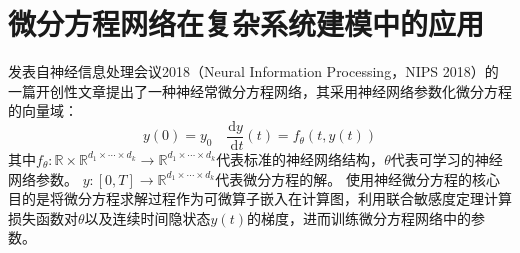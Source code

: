 
\section{微分方程网络在复杂系统建模中的应用}
发表自神经信息处理会议2018（Neural Information Processing，NIPS 2018）的一篇开创性文章\cite{chen2018neural}提出了一种神经常微分方程网络，其采用神经网络参数化微分方程的向量域\cite{kidger2021}：
\begin{equation}
y(0)=y_0 \quad \frac{\mathrm{d} y}{\mathrm{~d} t}(t)=f_\theta(t, y(t))
\end{equation}
其中$f_\theta: \mathbb{R} \times \mathbb{R}^{d_1 \times \cdots \times d_k} \rightarrow \mathbb{R}^{d_1 \times \cdots \times d_k}$代表标准的神经网络结构，$\theta$代表可学习的神经网络参数。
$y:[0, T] \rightarrow \mathbb{R}^{d_1 \times \cdots \times d_k}$代表微分方程的解。
使用神经微分方程的核心目的是将微分方程求解过程作为可微算子嵌入在计算图，利用联合敏感度定理\cite{chen2018neural}计算损失函数对$\theta$以及连续时间隐状态$y(t)$的梯度，进而训练微分方程网络中的参数。

